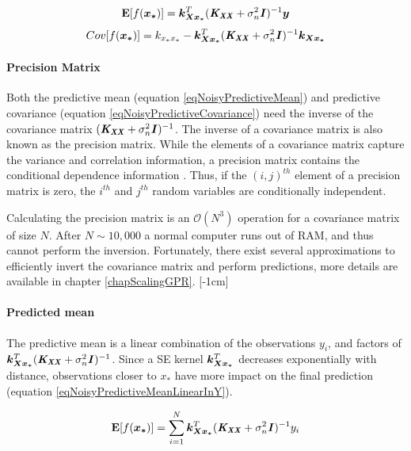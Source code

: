 \begin{equation}\label{eqNoisyPredictiveMean}
  \mathbf{E}[f(\boldsymbol{x_{*}})] = \boldsymbol{k_{Xx_{*}}}^T( \bm{\mathit{K_{XX}}} + \sigma^{2}_{n}\bm{\mathit{I}})^{-1} \boldsymbol{y}
  \end{equation}
  \begin{equation}\label{eqNoisyPredictiveCovariance}
	Cov[f(\boldsymbol{x_{*}})] = k_{x_{*}x_{*}} - \boldsymbol{k_{Xx_{*}}}^{T}( \bm{\mathit{K_{XX}}} + \sigma^{2}_{n}\bm{\mathit{I}} )^{-1} \boldsymbol{k_{Xx_{*}}}
  \end{equation}

\paragraph{Precision Matrix}  
Both the predictive mean (equation \ref{eqNoisyPredictiveMean}) and predictive covariance (equation \ref{eqNoisyPredictiveCovariance}) need the inverse of the covariance matrix $( \bm{\mathit{K_{XX}}} + \sigma^{2}_{n}\bm{\mathit{I}} )^{-1}$. The inverse of a covariance matrix is also known as the precision matrix. While the elements of a covariance matrix capture the variance and correlation information, a precision matrix contains the conditional dependence information \cite{mackay2003information}. Thus, if the $(i, j)^{th}$ element of a precision matrix is zero, the $i^{th}$ and $j^{th}$ random variables are conditionally independent. 

Calculating the precision matrix is an $\mathcal{O}\left ( N^{3} \right )$ operation for a covariance matrix of size $N$. After $N \sim 10,000$ a normal computer runs out of RAM, and thus cannot perform the inversion. Fortunately, there exist several approximations to efficiently invert the covariance matrix and perform predictions, more details are available in chapter \ref{chapScalingGPR}.
[-1cm]

\paragraph{Predicted mean}
The predictive mean is a linear combination of the observations $y_{i}$, and factors of $\boldsymbol{k_{Xx_{*}}}^{T}( \bm{\mathit{K_{XX}}} + \sigma^{2}_{n}\bm{\mathit{I}})^{-1}$. Since a SE kernel $\boldsymbol{k_{Xx_{*}}}^{T}$ decreases exponentially with distance, observations closer to $x_{*}$ have more impact on the final prediction (equation \ref{eqNoisyPredictiveMeanLinearInY}). 
  
  \begin{equation}\label{eqNoisyPredictiveMeanLinearInY}
  \mathbf{E}[f(\boldsymbol{x_{*}})] = \sum_{i = 1}^{N} \boldsymbol{k_{Xx_{*}}}^{T}( \bm{\mathit{K_{XX}}} + \sigma^{2}_{n}\bm{\mathit{I}})^{-1} y_{i}
  \end{equation}


